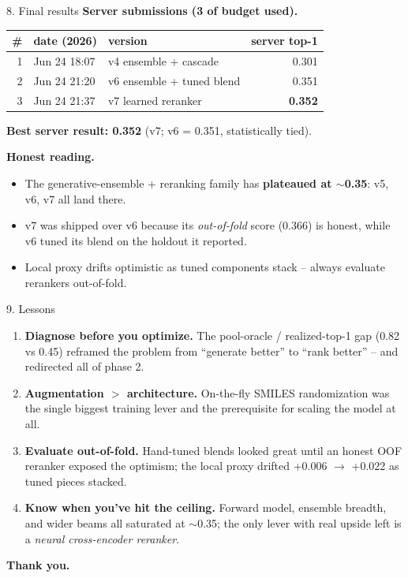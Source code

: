 \documentclass[aspectratio=169,11pt]{beamer}
\begin{document}
\begin{frame}{8. Final results}
  \textbf{Server submissions (3 of budget used).}
  \begin{center}
    \footnotesize
    \begin{tabular}{rllr}
      \toprule
      \# & date (2026) & version & server top-1 \\
      \midrule
      1 & Jun 24 18:07 & v4 ensemble + cascade   & 0.301 \\
      2 & Jun 24 21:20 & v6 ensemble + tuned blend & 0.351 \\
      3 & Jun 24 21:37 & v7 learned reranker     & \textbf{0.352} \\
      \bottomrule
    \end{tabular}
  \end{center}

  \medskip
  \textbf{Best server result: 0.352} (v7; v6 = 0.351, statistically tied).

  \vspace{0.4em}
  \textbf{Honest reading.}
  \begin{itemize}
    \item The generative-ensemble + reranking family has \textbf{plateaued at
      $\sim$0.35}: v5, v6, v7 all land there.
    \item v7 was shipped over v6 because its \emph{out-of-fold} score (0.366)
      is honest, while v6 tuned its blend on the holdout it reported.
    \item Local proxy drifts optimistic as tuned components stack -- always
      evaluate rerankers out-of-fold.
  \end{itemize}
\end{frame}

\begin{frame}{9. Lessons}
  \begin{enumerate}
    \item \textbf{Diagnose before you optimize.} The pool-oracle / realized-top-1
      gap (0.82 vs 0.45) reframed the problem from ``generate better'' to
      ``rank better'' -- and redirected all of phase 2.
    \item \textbf{Augmentation $>$ architecture.} On-the-fly SMILES
      randomization was the single biggest training lever and the prerequisite
      for scaling the model at all.
    \item \textbf{Evaluate out-of-fold.} Hand-tuned blends looked great until
      an honest OOF reranker exposed the optimism; the local proxy drifted
      +0.006 $\to$ +0.022 as tuned pieces stacked.
    \item \textbf{Know when you've hit the ceiling.} Forward model, ensemble
      breadth, and wider beams all saturated at $\sim$0.35; the only lever with
      real upside left is a \emph{neural cross-encoder reranker}.
  \end{enumerate}

  \vspace{0.6em}
  \begin{center}
    \large\textbf{Thank you.}
  \end{center}
\end{frame}
\end{document}
